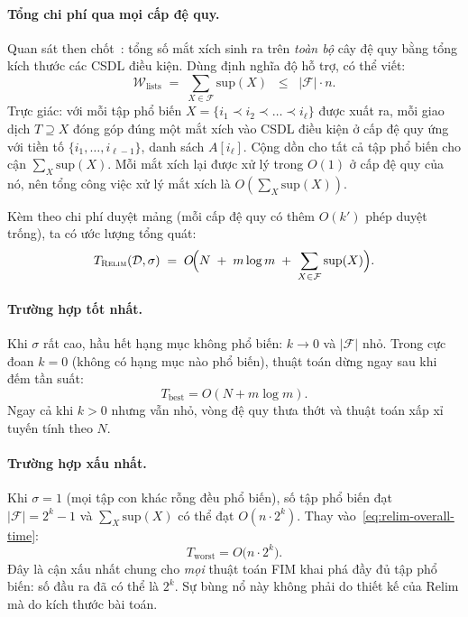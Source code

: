 \documentclass[12pt,a4paper]{report}
\begin{document}
\paragraph{Tổng chi phí qua mọi cấp đệ quy.}
Quan sát then chốt~\cite[Section~2]{borgelt2005}: tổng số mắt xích sinh ra trên
\textit{toàn bộ} cây đệ quy bằng tổng kích thước các CSDL điều kiện. Dùng định
nghĩa độ hỗ trợ, có thể viết:
\begin{equation}
    \mathcal{W}_{\text{lists}} \;=\; \sum_{X \in \mathcal{F}} \mathrm{sup}(X)
    \;\;\leq\;\; |\mathcal{F}| \cdot n.
    \label{eq:total-list-work}
\end{equation}
Trực giác: với mỗi tập phổ biến $X = \{i_1 \prec i_2 \prec \dots \prec i_\ell\}$
được xuất ra, mỗi giao dịch $T \supseteq X$ đóng góp đúng một mắt xích vào CSDL
điều kiện ở cấp đệ quy ứng với tiền tố $\{i_1,\dots,i_{\ell-1}\}$, danh sách
$A[i_\ell]$. Cộng dồn cho tất cả tập phổ biến cho cận
$\sum_{X} \mathrm{sup}(X)$. Mỗi mắt xích lại được xử lý trong $O(1)$ ở cấp đệ
quy của nó, nên tổng công việc xử lý mắt xích là
$O\!\left(\sum_X \mathrm{sup}(X)\right)$.

\noindent
Kèm theo chi phí duyệt mảng (mỗi cấp đệ quy có thêm $O(k')$ phép duyệt trống),
ta có ước lượng tổng quát:
\begin{equation}
    T_{\textsc{Relim}}(\mathcal{D}, \sigma) \;=\; O\!\Bigl(N \;+\; m\log m
    \;+\; \sum_{X \in \mathcal{F}} \mathrm{sup}(X)\Bigr).
    \label{eq:relim-overall-time}
\end{equation}

\paragraph{Trường hợp tốt nhất.}
Khi $\sigma$ rất cao, hầu hết hạng mục không phổ biến: $k \to 0$ và $|\mathcal{F}|$
nhỏ. Trong cực đoan $k=0$ (không có hạng mục nào phổ biến), thuật toán dừng
ngay sau khi đếm tần suất:
\begin{equation}
    T_{\text{best}} = O(N + m\log m).
\end{equation}
Ngay cả khi $k > 0$ nhưng vẫn nhỏ, vòng đệ quy thưa thớt và thuật toán xấp xỉ
tuyến tính theo $N$.

\paragraph{Trường hợp xấu nhất.}
Khi $\sigma = 1$ (mọi tập con khác rỗng đều phổ biến), số tập phổ biến đạt
$|\mathcal{F}| = 2^k - 1$ và $\sum_X \mathrm{sup}(X)$ có thể đạt
$O(n \cdot 2^k)$. Thay vào~\eqref{eq:relim-overall-time}:
\begin{equation}
    T_{\text{worst}} = O\!\bigl(n \cdot 2^k\bigr).
\end{equation}
Đây là cận xấu nhất chung cho \textit{mọi} thuật toán FIM khai phá đầy đủ tập
phổ biến: số đầu ra đã có thể là $2^k$. Sự bùng nổ này không phải do thiết kế
của Relim mà do kích thước bài toán.
\end{document}
